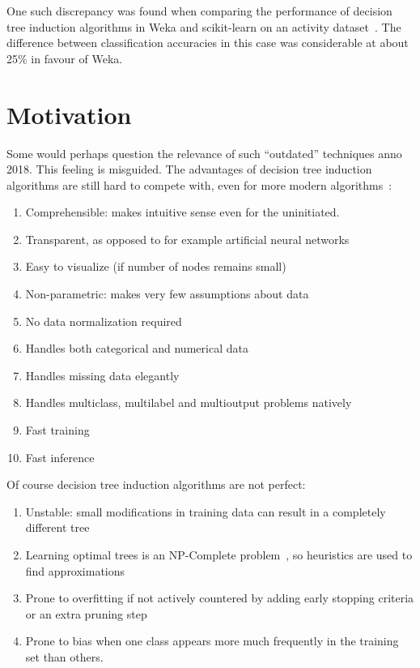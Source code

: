 One such discrepancy was found when comparing the performance of decision tree induction algorithms in Weka and scikit-learn on an activity dataset~\cite{problematic_dataset}. The difference between classification accuracies in this case was considerable at about 25\% in favour of Weka.

\section{Motivation}
Some would perhaps question the relevance of such ``outdated'' techniques anno 2018. This feeling is misguided. The advantages of decision tree induction algorithms are still hard to compete with, even for more modern algorithms~\cite{scikit-learn, murthy1998automatic, kotsiantis2007supervised}:

\begin{enumerate}
    \item Comprehensible: makes intuitive sense even for the uninitiated.
    \item Transparent, as opposed to for example artificial neural networks
    \item Easy to visualize (if number of nodes remains small)
    \item Non-parametric: makes very few assumptions about data
    \item No data normalization required
    \item Handles both categorical and numerical data
    \item Handles missing data elegantly %
    \item Handles multiclass, multilabel and multioutput problems natively
    \item Fast training
    \item Fast inference
\end{enumerate}

Of course decision tree induction algorithms are not perfect:
\begin{enumerate}
    \item Unstable: small modifications in training data can result in a completely different tree
    \item Learning optimal trees is an NP-Complete problem~\cite{npcomplete}, so heuristics are used to find approximations
    \item Prone to overfitting if not actively countered by adding early stopping criteria or an extra pruning step
    \item Prone to bias when one class appears more much frequently in the training set than others.
\end{enumerate}

